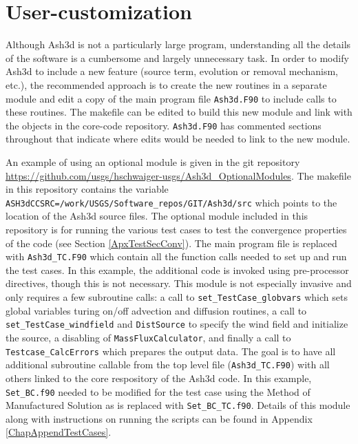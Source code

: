 \section{User-customization}\label{ChapSoftwareStructureUserCust}
Although Ash3d is not a particularly large program, understanding all the
details of the software is a cumbersome and largely unnecessary task.  In
order to modify Ash3d to include a new feature (source term,
evolution or removal mechanism, etc.), the recommended approach is to
create the new routines in a separate module and edit a copy of the main
program file \texttt{Ash3d.F90} to include calls to these routines.  The makefile
can be edited to build this new module and link with the objects in the
core-code repository.  \texttt{Ash3d.F90} has commented sections throughout
that indicate where edits would be needed to link to the new module.

An example
of using an optional module is given in the git repository
\url{https://github.com/usgs/hschwaiger-usgs/Ash3d\_OptionalModules}.
The makefile in this repository contains the variable
\texttt{ASH3dCCSRC=/work/USGS/Software\_repos/GIT/Ash3d/src} which points to the
location of the Ash3d source files.  The optional module included in this repository
is for running the various test cases to test the convergence properties
of the code (see Section \ref{ApxTestSecConv}).  The main program file is replaced with
\texttt{Ash3d\_TC.F90} which contain all the function calls needed to set up and
run the test cases.  In this example, the additional code is invoked using
pre-processor directives, though this is not necessary.
This module is not especially invasive and only requires a few subroutine calls:
a call to \texttt{set\_TestCase\_globvars} which sets global variables turing on/off
advection and diffusion routines, a call to \texttt{set\_TestCase\_windfield} and
\texttt{DistSource} to specify the wind field and initialize the source, a disabling
of \texttt{MassFluxCalculator}, and finally a call to \texttt{Testcase\_CalcErrors}
which prepares the output data. The goal is to have all additional subroutine callable
from the top level file (\texttt{Ash3d\_TC.F90}) with all others linked to
the core respository of the Ash3d
code. In this example, \texttt{Set\_BC.f90} needed to be modified for the
test case using the Method of Manufactured Solution as is replaced with
\texttt{Set\_BC\_TC.f90}.
Details of this module along with instructions on running the scripts can be found
in Appendix \ref{ChapAppendTestCases}.

